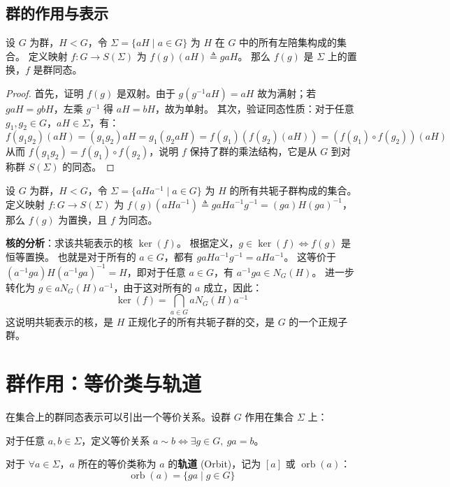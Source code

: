\documentclass[11pt]{article}
\begin{document}
\subsection{群的作用与表示}

\begin{cntheorem}[左乘诱导的表示]
    设 $G$ 为群，$H < G$，令 $\Sigma = \{aH \mid a \in G\}$ 为 $H$ 在 $G$ 中的所有左陪集构成的集合。
    定义映射 $f: G \to S(\Sigma)$ 为 $f(g)(aH) \triangleq gaH$。
    那么 $f(g)$ 是 $\Sigma$ 上的置换，$f$ 是群同态。
\end{cntheorem}

\begin{proof}
    首先，证明 $f(g)$ 是双射。由于 $g(g^{-1}aH) = aH$ 故为满射；若 $gaH = gbH$，左乘 $g^{-1}$ 得 $aH = bH$，故为单射。
    其次，验证同态性质：对于任意 $g_1, g_2 \in G$，$aH \in \Sigma$，有：
    \[
    f(g_1 g_2)(aH) = (g_1 g_2)aH = g_1(g_2 aH) = f(g_1)(f(g_2)(aH)) = (f(g_1) \circ f(g_2))(aH)
    \]
    从而 $f(g_1 g_2) = f(g_1) \circ f(g_2)$，说明 $f$ 保持了群的乘法结构，它是从 $G$ 到对称群 $S(\Sigma)$ 的同态。
\end{proof}

\begin{cntheorem}[共轭表示]
    设 $G$ 为群，$H < G$，令 $\Sigma = \{aHa^{-1} \mid a \in G\}$ 为 $H$ 的所有共轭子群构成的集合。
    定义映射 $f: G \to S(\Sigma)$ 为 $f(g)(aHa^{-1}) \triangleq gaHa^{-1}g^{-1} = (ga)H(ga)^{-1}$，那么 $f(g)$ 为置换，且 $f$ 为同态。
\end{cntheorem}

\textbf{核的分析}：求该共轭表示的核 $\ker(f)$。
根据定义，$g \in \ker(f) \iff f(g)$ 是恒等置换。
也就是对于所有的 $a \in G$，都有 $gaHa^{-1}g^{-1} = aHa^{-1}$。
这等价于 $(a^{-1}g a)H(a^{-1}g a)^{-1} = H$，即对于任意 $a \in G$，有 $a^{-1}g a \in N_G(H)$。
进一步转化为 $g \in a N_G(H) a^{-1}$，由于这对所有的 $a$ 成立，因此：
\[
\ker(f) = \bigcap_{a \in G} a N_G(H) a^{-1}
\]
这说明共轭表示的核，是 $H$ 正规化子的所有共轭子群的交，是 $G$ 的一个正规子群。

\section{群作用：等价类与轨道}

在集合上的群同态表示可以引出一个等价关系。设群 $G$ 作用在集合 $\Sigma$ 上：

\begin{cndefinition}[等价关系与轨道]
    对于任意 $a, b \in \Sigma$，定义等价关系 $a \sim b \iff \exists g \in G, ~ ga = b$。
    
    对于 $\forall a \in \Sigma$，$a$ 所在的等价类称为 $a$ 的\textbf{轨道} (Orbit)，记为 $[a]$ 或 $\operatorname{orb}(a)$：
    \[
    \operatorname{orb}(a) = \{ga \mid g \in G\}
    \]
\end{cndefinition}
\end{document}
